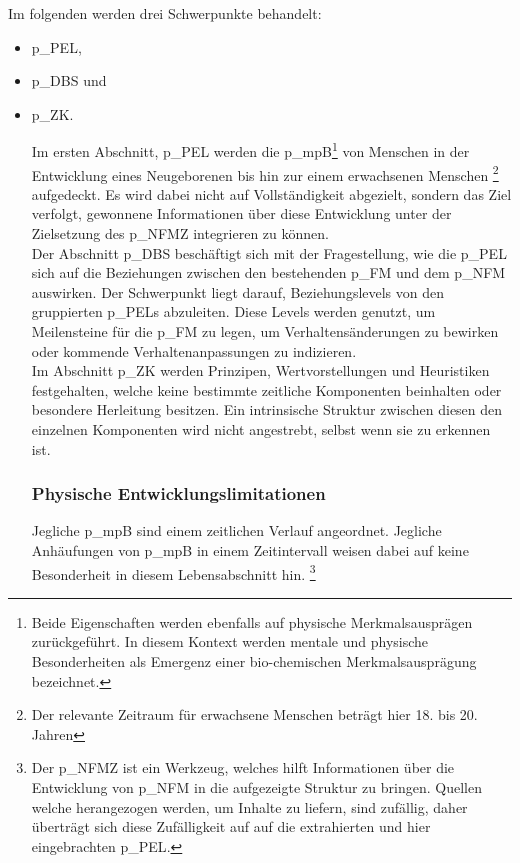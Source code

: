 Im folgenden werden drei Schwerpunkte behandelt: 
\begin{itemize}
	\item \gls{p_PEL},
	\item \gls{p_DBS} und
	\item \gls{p_ZK}.

Im ersten Abschnitt, \gls{p_PEL} werden die \gls{p_mpB}\footnote{Beide Eigenschaften werden ebenfalls auf physische Merkmalsausprägen zurückgeführt. In diesem Kontext werden mentale und physische Besonderheiten als Emergenz einer bio-chemischen Merkmalsausprägung bezeichnet.} von Menschen in der Entwicklung eines Neugeborenen bis hin zur einem erwachsenen Menschen \footnote{Der relevante Zeitraum für erwachsene Menschen beträgt hier 18. bis 20. Jahren} aufgedeckt. Es wird dabei nicht auf Vollständigkeit abgezielt, sondern das Ziel verfolgt, gewonnene Informationen über diese Entwicklung unter der Zielsetzung des \gls{p_NFMZ} integrieren zu können.\\

Der Abschnitt \gls{p_DBS} beschäftigt sich mit der Fragestellung, wie die \gls{p_PEL} sich auf die Beziehungen zwischen den bestehenden \gls{p_FM} und dem \gls{p_NFM} auswirken. Der Schwerpunkt liegt darauf, Beziehungslevels von den gruppierten \glspl{p_PEL} abzuleiten. Diese Levels werden genutzt, um Meilensteine für die \gls{p_FM} zu legen, um Verhaltensänderungen zu bewirken oder kommende Verhaltenanpassungen zu indizieren.\\

Im Abschnitt \gls{p_ZK} werden Prinzipen, Wertvorstellungen und Heuristiken festgehalten, welche keine bestimmte zeitliche Komponenten beinhalten oder besondere Herleitung besitzen. Ein intrinsische Struktur zwischen diesen den einzelnen Komponenten wird nicht angestrebt, selbst wenn sie zu erkennen ist.

\subsubsection{Physische Entwicklungslimitationen}
Jegliche \gls{p_mpB} sind einem zeitlichen Verlauf angeordnet. Jegliche Anhäufungen von \gls{p_mpB} in einem Zeitintervall weisen dabei auf keine Besonderheit in diesem Lebensabschnitt hin. \footnote{Der \gls{p_NFMZ} ist ein Werkzeug, welches hilft Informationen über die Entwicklung von \gls{p_NFM} in die aufgezeigte Struktur zu bringen. Quellen welche herangezogen werden, um Inhalte zu liefern, sind zufällig, daher überträgt sich diese Zufälligkeit auf auf die extrahierten und hier eingebrachten \gls{p_PEL}.}%
\\


\end{itemize}
